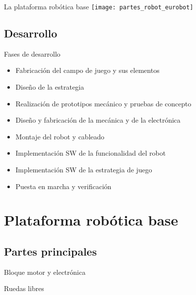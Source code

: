 \documentclass{beamer}
\begin{document}
\begin{frame}{La plataforma robótica base}
\centering
\texttt{[image: partes\_robot\_eurobot]}
\end{frame}

\subsection{Desarrollo}

\begin{frame}{Fases de desarrollo}

\begin{itemize}
\item<1-> Fabricación del campo de juego y sus elementos
\item<2-> Diseño de la estrategia
\item<3-> Realización de prototipos mecánico y pruebas de concepto
\item<4-> Diseño y fabricación de la mecánica y de la electrónica
\item<5-> Montaje del robot y cableado
\item<4-> Implementación SW de la funcionalidad del robot
\item<4-> Implementación SW de la estrategia de juego
\item<6-> Puesta en marcha y verificación
\end{itemize}
\end{frame}

\section{Plataforma robótica base}
\subsection{Partes principales}

\begin{frame}{Bloque motor y electrónica}
\begin{center}
\end{center}
\end{frame}

\begin{frame}{Ruedas libres}
\begin{center}
\end{center}
\end{frame}
\end{document}
